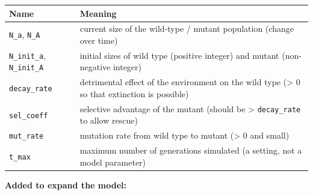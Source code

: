 \documentclass[
]{article}
\begin{document}
\begin{longtable}[]{@{}
  >{\raggedright\arraybackslash}p{}
  >{\raggedright\arraybackslash}p{}@{}}
\toprule\noalign{}
\begin{minipage}[b]{\linewidth}\raggedright
Name
\end{minipage} & \begin{minipage}[b]{\linewidth}\raggedright
Meaning
\end{minipage} \\
\midrule\noalign{}
\endhead
\bottomrule\noalign{}
\endlastfoot
\texttt{N\_a}, \texttt{N\_A} & current size of the wild-type / mutant
population (change over time) \\
\texttt{N\_init\_a}, \texttt{N\_init\_A} & initial sizes of wild type
(positive integer) and mutant (non-negative integer) \\
\texttt{decay\_rate} & detrimental effect of the environment on the wild
type (\textgreater{} 0 so that extinction is possible) \\
\texttt{sel\_coeff} & selective advantage of the mutant (should be
\textgreater{} \texttt{decay\_rate} to allow rescue) \\
\texttt{mut\_rate} & mutation rate from wild type to mutant
(\textgreater{} 0 and small) \\
\texttt{t\_max} & maximum number of generations simulated (a setting,
not a model parameter) \\
\end{longtable}

\textbf{Added to expand the model:}
\end{document}
